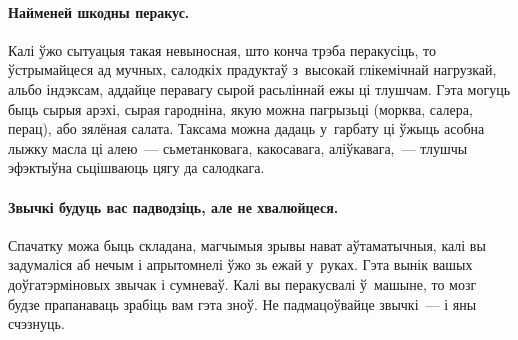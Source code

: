 \paragraph{Найменей шкодны перакус.}
Калі ўжо сытуацыя такая невыносная, што конча трэба перакусіць, то ўстрымайцеся ад мучных, салодкіх прадуктаў з~высокай глікемічнай нагрузкай, альбо індэксам, аддайце перавагу сырой расьліннай ежы ці тлушчам. Гэта могуць быць сырыя арэхі, сырая гародніна, якую можна пагрызьці (морква, салера, перац), або зялёная салата. Таксама можна дадаць у~гарбату ці ўжыць асобна лыжку масла ці алею~--- сьметанковага, какосавага, аліўкавага,~--- тлушчы эфэктыўна сьцішваюць цягу да салодкага.

\paragraph{Звычкі будуць вас падводзіць, але не хвалюйцеся.}
Спачатку можа быць складана, магчымыя зрывы нават аўтаматычныя, калі вы задумаліся аб нечым і апрытомнелі ўжо зь ежай у~руках. Гэта вынік вашых доўгатэрміновых звычак і сумневаў. Калі вы перакусвалі ў~машыне, то мозг будзе прапанаваць зрабіць вам гэта зноў. Не падмацоўвайце звычкі~--- і яны счэзнуць.

